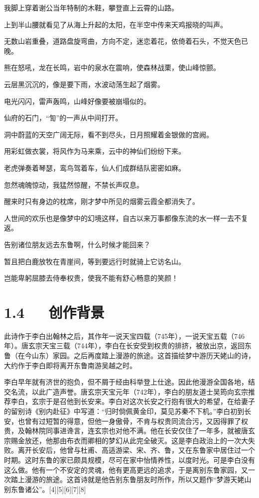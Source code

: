 \documentclass[letterpaper,12pt,english]{sphinxmanual}
\begin{document}
我脚上穿着谢公当年特制的木鞋，攀登直上云霄的山路。

上到半山腰就看见了从海上升起的太阳，在半空中传来天鸡报晓的叫声。

无数山岩重叠，道路盘旋弯曲，方向不定，迷恋着花，依倚着石头，不觉天色已晚。

熊在怒吼，龙在长鸣，岩中的泉水在震响，使森林战栗，使山峰惊颤。

云层黑沉沉的，像是要下雨，水波动荡生起了烟雾。

电光闪闪，雷声轰鸣，山峰好像要被崩塌似的。

仙府的石门，“訇”的一声从中间打开。

洞中蔚蓝的天空广阔无际，看不到尽头，日月照耀着金银做的宫阙。

用彩虹做衣裳，将风作为马来乘，云中的神仙们纷纷下来。

老虎弹奏着琴瑟，鸾鸟驾着车，仙人们成群结队密密如麻。

忽然魂魄惊动，我猛然惊醒，不禁长声叹息。

醒来时只有身边的枕席，刚才梦中所见的烟雾云霞全都消失了。

人世间的欢乐也是像梦中的幻境这样，自古以来万事都像东流的水一样一去不复返。

告别诸位朋友远去东鲁啊，什么时候才能回来？

暂且把白鹿放牧在青崖间，等到要远行时就骑上它访名山。

岂能卑躬屈膝去侍奉权贵，使我不能有舒心畅意的笑颜！


\section{1.4   创作背景}
\label{\detokenize{p01_u6563_u6587/_u674e_u767d-_u68a6_u6e38_u5929_u59e5_u541f_u7559_u522b:id6}}
此诗作于李白出翰林之后，其作年一说天宝四载（745年），一说天宝五载（746年）。唐玄宗天宝三载（744年），李白在长安受到权贵的排挤，被放出京，返回东鲁（在今山东）家园。之后再度踏上漫游的旅途。这首描绘梦中游历天姥山的诗，大约作于李白即将离开东鲁南游吴越之时。

李白早年就有济世的抱负，但不屑于经由科举登上仕途。因此他漫游全国各地，结交名流，以此广造声誉。唐玄宗天宝元年（742年），李白的朋友道士吴筠向玄宗推荐李白，玄宗于是召他到长安来。李白对这次长安之行抱有很大的希望，在给妻子的留别诗《别内赴征》中写道：“归时倘佩黄金印，莫见苏秦不下机。”李白初到长安，也曾有过短暂的得意，但他一身傲骨，不肯与权贵同流合污，又因得罪了权贵，及翰林院同事进谗言，连玄宗也对他不满。他在长安仅住了一年多，就被唐玄宗赐金放还，他那由布衣而卿相的梦幻从此完全破灭。这是李白政治上的一次大失败。离开长安后，他曾与杜甫、高适游梁、宋、齐、鲁，又在东鲁家中居住过一个时期。这时东鲁的家已颇具规模，尽可在家中怡情养性，以度时光。可是李白没有这么做。他有一个不安定的灵魂，他有更高更远的追求，于是离别东鲁家园，又一次踏上漫游的旅途。这首诗就是他告别东鲁朋友时所作，所以又题作“梦游天姥山别东鲁诸公”。{[}4{]}{[}5{]}{[}6{]}{[}7{]}{[}8{]}
\end{document}
